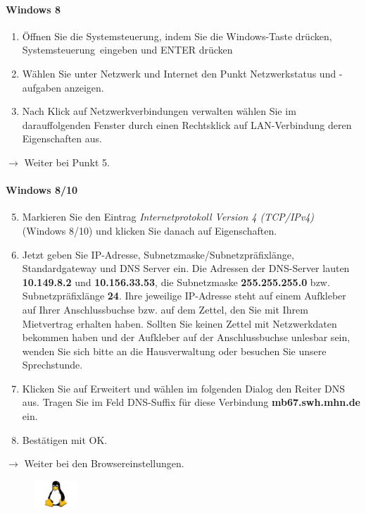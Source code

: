 \documentclass[a4paper,12pt]{scrartcl}
\begin{document}
\paragraph*{Windows 8}
\begin{enumerate}
	\item Öffnen Sie die Systemsteuerung, indem Sie die Windows-Taste drücken, \glqq Systemsteuerung\grqq  \ eingeben und ENTER drücken
	\item Wählen Sie unter Netzwerk und Internet den Punkt Netzwerkstatus und -aufgaben anzeigen.
    \item Nach Klick auf Netzwerkverbindungen verwalten wählen Sie im darauffolgenden Fenster durch einen Rechtsklick auf LAN-Verbindung deren Eigenschaften aus.
\end{enumerate}
$\rightarrow$ Weiter bei Punkt 5.



\paragraph*{Windows 8/10}
\begin{enumerate}
    \setcounter{enumi}{4}
    \item Markieren Sie den Eintrag \textit{Internetprotokoll Version 4 (TCP/IPv4)} (Windows 8/10) und klicken Sie danach auf Eigenschaften.
    \item Jetzt geben Sie IP-Adresse, Subnetzmaske/Subnetzpräfixlänge, Standardgateway und DNS Server ein. Die Adressen der DNS-Server lauten \textbf{10.149.8.2} und \textbf{10.156.33.53}, die Subnetzmaske \textbf{255.255.255.0} bzw. Subnetzpräfixlänge \textbf{24}. Ihre jeweilige IP-Adresse steht auf einem Aufkleber auf Ihrer Anschlussbuchse bzw. auf dem Zettel, den Sie mit Ihrem Mietvertrag erhalten haben. Sollten Sie keinen Zettel mit Netzwerkdaten bekommen haben und der Aufkleber auf der Anschlussbuchse unlesbar sein, wenden Sie sich bitte an die Hausverwaltung oder besuchen Sie unsere Sprechstunde.
    \item Klicken Sie auf Erweitert und wählen im folgenden Dialog den Reiter DNS aus. Tragen Sie im Feld DNS-Suffix für diese Verbindung \textbf{mb67.swh.mhn.de} ein.
    \item Bestätigen mit OK.
\end{enumerate}
$\rightarrow$ Weiter bei den Browsereinstellungen.



\pagebreak

\begin{figure}[t!]
	\raggedleft
	\vspace{-20pt}
	\includegraphics[height=1cm,keepaspectratio]{Bilder/linux_logo_neu}
	\vspace{-30pt}
\end{figure}
\end{document}
